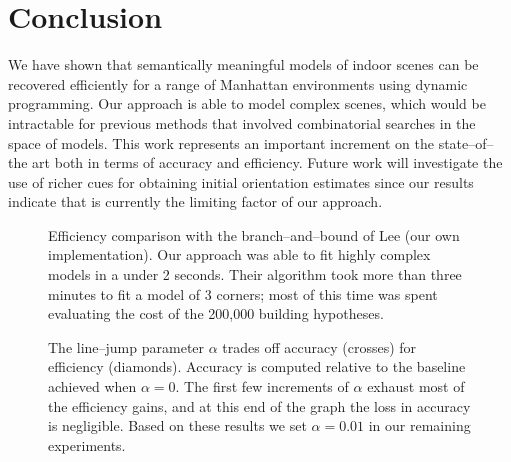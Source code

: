 \section{Conclusion}

We have shown that semantically meaningful models of indoor scenes can
be recovered efficiently for a range of Manhattan environments using
dynamic programming. Our approach is able to model complex scenes,
which would be intractable for previous methods that involved
combinatorial searches in the space of models. This work represents an
important increment on the state--of--the art both in terms of
accuracy and efficiency. Future work will investigate the use of
richer cues for obtaining initial orientation estimates since our
results indicate that is currently the limiting factor of our
approach.

\begin{figure}[tb]
\centering

\caption{Efficiency comparison with the branch--and--bound of Lee
  \etal \cite{Lee09} (our own implementation). Our approach was able to
  fit highly complex models in a under 2 seconds. Their algorithm took
  more than three minutes to fit a model of 3 corners; most of this
  time was spent evaluating the cost of the 200,000 building
  hypotheses.}
\label{fig:time-vs-k}
\end{figure}

\begin{figure}[tb]
\centering

\caption{The line--jump parameter $\alpha$ trades off accuracy
  (crosses) for efficiency (diamonds). Accuracy is computed relative
  to the baseline achieved when $\alpha=0$. The first few increments
  of $\alpha$ exhaust most of the efficiency gains, and at this end of
  the graph the loss in accuracy is negligible. Based on these results
  we set $\alpha=0.01$ in our remaining experiments.}
\label{fig:jump-thresh}
\end{figure}



